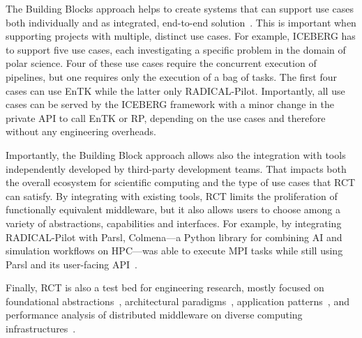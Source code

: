 \documentclass[preprint,12pt, a4paper]{elsarticle}
\begin{document}
The Building Blocks approach helps to create systems that can support use cases
both individually and as integrated, end-to-end
solution~\cite{turilli2019middleware}. This is important when supporting
projects with multiple, distinct use cases. For example, ICEBERG has to support
five use cases, each investigating a specific problem in the domain of polar
science. Four of these use cases require the concurrent execution of pipelines,
but one requires only the execution of a bag of tasks. The first four cases can
use EnTK while the latter only RADICAL-Pilot. Importantly, all use cases can be
served by the ICEBERG framework with a minor change in the private API to call
EnTK or RP, depending on the use cases and therefore without any engineering
overheads.

Importantly, the Building Block approach allows also the integration with tools
independently developed by third-party development teams. That impacts both the
overall ecosystem for scientific computing and the type of use cases that RCT
can satisfy. By integrating with existing tools, RCT limits the proliferation of
functionally equivalent middleware, but it also allows users to choose among a
variety of abstractions, capabilities and interfaces. For example, by
integrating RADICAL-Pilot with Parsl, Colmena---a Python library for combining
AI and simulation workflows on HPC---was able to execute MPI tasks while still
using Parsl and its user-facing API~\cite{alsaadi2022radical}.


Finally, RCT is also a test bed for engineering research, mostly focused on
foundational abstractions~\cite{turilli2017evaluating}, architectural
paradigms~\cite{turilli2018comprehensive}, application
patterns~\cite{balasubramanian2016extasy,balasubramanian2018harnessing}, and
performance analysis of distributed middleware on diverse computing
infrastructures~\cite{turilli2017evaluating,dakka2018high}.

\end{document}
